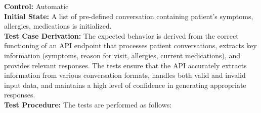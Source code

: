 \documentclass[12pt, titlepage]{article}
\begin{document}
\textbf{Control:} Automatic\\
\textbf{Initial State:} A list of pre-defined conversation containing patient's symptoms, allergies, medications is initialized.\\
\textbf{Test Case Derivation:} The expected behavior is derived from the correct functioning of an API endpoint that processes patient conversations, extracts key information (symptoms, reason for visit, allergies, current medications), and provides relevant responses. The tests ensure that the API accurately extracts information from various conversation formats, handles both valid and invalid input data, and maintains a high level of confidence in generating appropriate responses.\\
\textbf{Test Procedure:} The tests are performed as follows:\\
\end{document}
